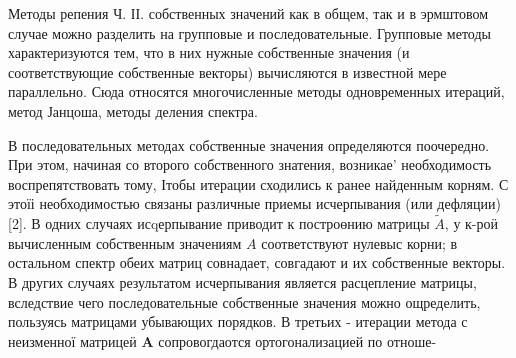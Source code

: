 \documentclass[10pt]{article}
\begin{document}
Методы репения Ч. ІІ. собственных значений как в общем, так и в эрмштовом случае можно разделить на групповые и последовательные. Групповые методы характеризуются тем, что в них нужные собственные значения (и соответствующие собственные векторы) вычисляются в известной мере параллельно. Сюда относятся многочисленные методы одновременных итераций, метод Јанцоша, методы деления спектра.



В последовательных методах собственные значения определяются поочередно. При этом, начиная со второго собственного знатения, возникае' необходимость воспрепятствовать тому, Ітобы итерации сходились к ранее найденным корням. С этоїі необходимостью связаны различные приемы исчерпывания (или дефляции) [2]. В одних случаях исqерпывание приводит к построөнию матрицы $\tilde{A}$, у к-роӥ вычисленным собственным значениям $A$ соответствуют нулевыс корни; в остальном спектр обеих матриц совнадает, совгадают и их собственные векторы. В других случаях результатом исчерпывания является расцепление матрицы, вследствие чего последовательные собственные значения можно ощределить, пользуясь матрицами убывающих порядков. В третьих - итерации метода с неизменної матрицеӥ $\boldsymbol{A}$ сопровогдаотся ортогонализацией по отноше-
\end{document}
